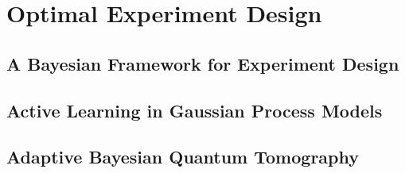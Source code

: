 \part{Optimal Experiment Design}

\chapter{A Bayesian Framework for Experiment Design\label{sec:active_learning_framework}}


\chapter{Active Learning in Gaussian Process Models}


\chapter{Adaptive Bayesian Quantum Tomography}

